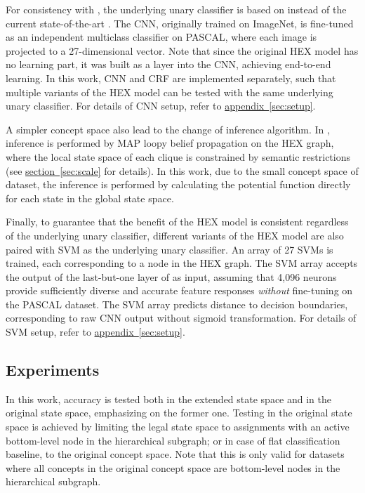 \documentclass[11pt,a4paper]{article}
\begin{document}
For consistency with \cite{deng2014large}, the underlying unary classifier is based on \cite{krizhevsky2012imagenet} instead of the current state-of-the-art \cite{simonyan2014very}. The CNN, originally trained on ImageNet, is fine-tuned as an independent multiclass classifier on PASCAL, where each image is projected to a 27-dimensional vector. Note that since the original HEX model has no learning part, it was built as a layer into the CNN, achieving end-to-end learning. In this work, CNN and CRF are implemented separately, such that multiple variants of the HEX model can be tested with the same underlying unary classifier. For details of CNN setup, refer to \hyperref[sec:setup]{appendix~\ref{sec:setup}}.

A simpler concept space also lead to the change of inference algorithm. In \cite{deng2014large}, inference is performed by MAP loopy belief propagation on the HEX graph, where the local state space of each clique is constrained by semantic restrictions (see \hyperref[sec:scale]{section~\ref{sec:scale}} for details). In this work, due to the small concept space of dataset, the inference is performed by calculating the potential function directly for each state in the global state space.

Finally, to guarantee that the benefit of the HEX model is consistent regardless of the underlying unary classifier, different variants of the HEX model are also paired with SVM as the underlying unary classifier. An array of 27 SVMs is trained, each corresponding to a node in the HEX graph. The SVM array accepts the output of the last-but-one layer of \cite{krizhevsky2012imagenet} as input, assuming that 4,096 neurons provide sufficiently diverse and accurate feature responses \emph{without} fine-tuning on the PASCAL dataset. The SVM array predicts distance to decision boundaries, corresponding to raw CNN output without sigmoid transformation. For details of SVM setup, refer to \hyperref[sec:setup]{appendix~\ref{sec:setup}}.

\subsection{Experiments}
\label{sec:exp1}

In this work, accuracy is tested both in the extended state space and in the original state space, emphasizing on the former one. Testing in the original state space is achieved by limiting the legal state space to assignments with an active bottom-level node in the hierarchical subgraph; or in case of flat classification baseline, to the original concept space. Note that this is only valid for datasets where all concepts in the original concept space are bottom-level nodes in the hierarchical subgraph.
\end{document}
